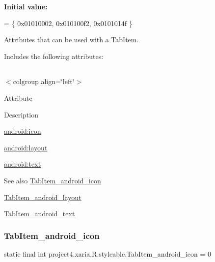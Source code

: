 {\bfseries Initial value\+:}
\begin{DoxyCode}
= \{
            0x01010002, 0x010100f2, 0x0101014f
        \}
\end{DoxyCode}
Attributes that can be used with a Tab\+Item. 

Includes the following attributes\+:

\tabulinesep=1mm
\begin{longtabu} spread 0pt [c]{*{0}{|X[-1]}|}
\hline
\end{longtabu}
$<$colgroup align=\char`\"{}left\char`\"{}$>$ 

Attribute

Description 

{\ttfamily \hyperlink{classproject4_1_1xaria_1_1R_1_1styleable_a8d8d3c4695fd974f6288de47645e9ece}{android\+:icon}}

{\ttfamily \hyperlink{classproject4_1_1xaria_1_1R_1_1styleable_a4708f852a2b7a77a451d9c8a9d2cf9f0}{android\+:layout}}

{\ttfamily \hyperlink{classproject4_1_1xaria_1_1R_1_1styleable_a148413384f89d5627ea689b9ed1a8036}{android\+:text}}

\begin{DoxySeeAlso}{See also}
\hyperlink{classproject4_1_1xaria_1_1R_1_1styleable_a8d8d3c4695fd974f6288de47645e9ece}{Tab\+Item\+\_\+android\+\_\+icon} 

\hyperlink{classproject4_1_1xaria_1_1R_1_1styleable_a4708f852a2b7a77a451d9c8a9d2cf9f0}{Tab\+Item\+\_\+android\+\_\+layout} 

\hyperlink{classproject4_1_1xaria_1_1R_1_1styleable_a148413384f89d5627ea689b9ed1a8036}{Tab\+Item\+\_\+android\+\_\+text} 
\end{DoxySeeAlso}
\mbox{\label{classproject4_1_1xaria_1_1R_1_1styleable_a8d8d3c4695fd974f6288de47645e9ece}} 
\subsubsection{\texorpdfstring{Tab\+Item\+\_\+android\+\_\+icon}{TabItem\_android\_icon}}
{\footnotesize\ttfamily static final int project4.\+xaria.\+R.\+styleable.\+Tab\+Item\+\_\+android\+\_\+icon = 0\hspace{0.3cm}{\ttfamily [static]}}

